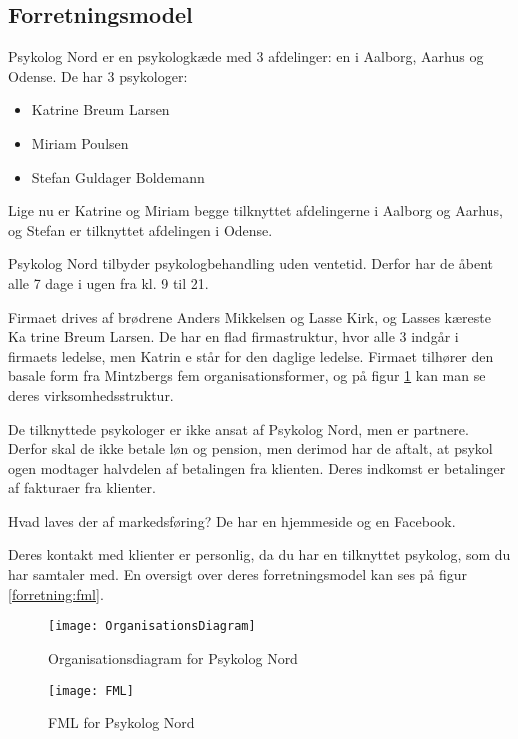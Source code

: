 \subsection{Forretningsmodel}
Psykolog Nord er en psykologkæde med 3 afdelinger: en i Aalborg, Aarhus og Odense. De har 3 psykologer:

\begin{itemize}
    \item Katrine Breum Larsen
    \item Miriam Poulsen
    \item Stefan Guldager Boldemann
\end{itemize}

Lige nu er Katrine og Miriam begge tilknyttet afdelingerne i Aalborg og Aarhus, og Stefan er tilknyttet afdelingen i Odense.

Psykolog Nord tilbyder psykologbehandling uden ventetid.
Derfor har de åbent alle 7 dage i ugen fra kl. 9 til 21.

Firmaet drives af brødrene Anders Mikkelsen og Lasse Kirk, og Lasses kæreste Ka
trine Breum Larsen.
De har en flad firmastruktur, hvor alle 3 indgår i firmaets ledelse, men Katrin
e står for den daglige ledelse. 
Firmaet tilhører den basale form fra Mintzbergs fem organisationsformer, og på 
figur \ref{forretning:organisationsdiagram} kan man se deres virksomhedsstruktur.

De tilknyttede psykologer er ikke ansat af Psykolog Nord, men er partnere.
Derfor skal de ikke betale løn og pension, men derimod har de aftalt, at psykol
ogen modtager halvdelen af betalingen fra klienten.
Deres indkomst er betalinger af fakturaer fra klienter.

Hvad laves der af markedsføring? De har en hjemmeside og en Facebook.

Deres kontakt med klienter er personlig, da du har en tilknyttet psykolog, som 
du har samtaler med. En oversigt over deres forretningsmodel kan ses på figur \ref{forretning:fml}.

\begin{figure}
    \caption{Organisationsdiagram for Psykolog Nord}
    \centering
        \texttt{[image: OrganisationsDiagram]}
    \label{forretning:organisationsdiagram}
\end{figure}

\begin{figure}
    \caption{FML for Psykolog Nord}
    \centering
        \texttt{[image: FML]}
    \label{forreting:fml}
\end{figure}

